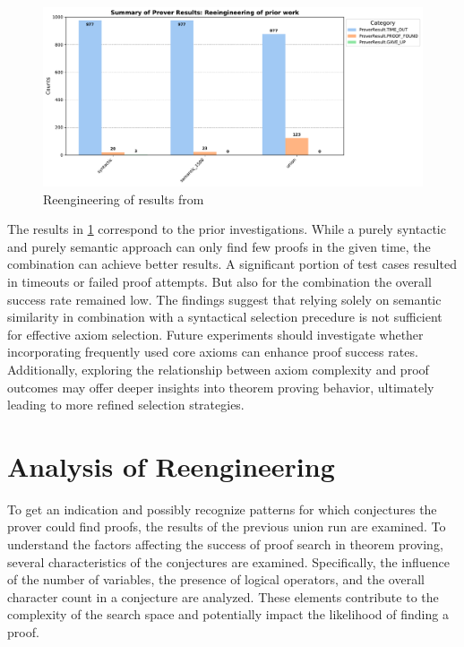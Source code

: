 \documentclass[english,version-2020-11]{uzl-thesis}
\begin{document}
\begin{figure}[ht]
    \centering
    \includegraphics[width=\textwidth]{standard_mode_noAdded_output.pdf}
    \caption{Reengineering of results from \cite{Schon2024}}
    \label{fig:reengineering}
\end{figure}

The results in \ref{fig:reengineering} correspond to the prior investigations. While a purely syntactic and purely semantic approach can only find few proofs in the given time, the combination can achieve better results.
A significant portion of test cases resulted in timeouts or failed proof attempts. But also for the combination the overall success rate remained low.
The findings suggest that relying solely on semantic similarity in combination with a syntactical selection precedure is not sufficient for effective axiom selection. Future experiments should investigate whether incorporating frequently used core axioms can enhance proof success rates. Additionally, exploring the relationship between axiom complexity and proof outcomes may offer deeper insights into theorem proving behavior, ultimately leading to more refined selection strategies.


\section{Analysis of Reengineering}

To get an indication and possibly recognize patterns for which conjectures the prover could find proofs, the results of the previous union run are examined. To understand the factors affecting the success of proof search in theorem proving, several characteristics of the conjectures are examined. Specifically, the influence of the number of variables, the presence of logical operators, and the overall character count in a conjecture are analyzed. These elements contribute to the complexity of the search space and potentially impact the likelihood of finding a proof.
\end{document}
